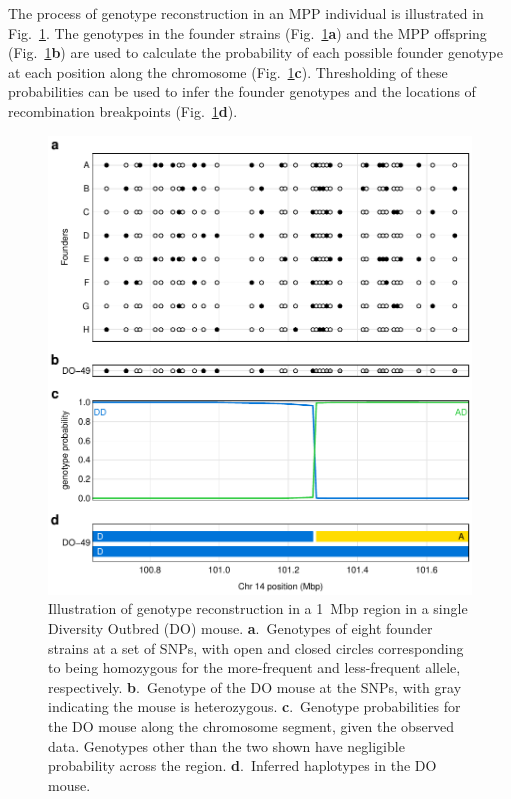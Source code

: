 \documentclass[12pt,letterpaper]{article}\usepackage[]{graphicx}\usepackage[table]{xcolor}
\begin{document}
The process of genotype reconstruction in an MPP individual is
illustrated in Fig.~\ref{fig1_genome_reconstr}. The genotypes in the
founder strains (Fig.~\ref{fig1_genome_reconstr}\textbf{a}) and the MPP
offspring (Fig.~\ref{fig1_genome_reconstr}\textbf{b}) are used to calculate the
probability of each possible founder genotype at each position along the chromosome
(Fig.~\ref{fig1_genome_reconstr}\textbf{c}). Thresholding of these
probabilities can be used to infer the founder genotypes and the
locations of recombination breakpoints (Fig.~\ref{fig1_genome_reconstr}\textbf{d}).



\begin{figure}
\centering
\includegraphics[width=\textwidth]{Figs/fig1_genome_reconstr.pdf}

\caption{Illustration of genotype reconstruction in a 1~Mbp region in
  a single Diversity Outbred (DO) mouse. \textbf{a}.~Genotypes of
  eight founder strains at a set of SNPs, with open and closed circles
  corresponding to being homozygous for the more-frequent and
  less-frequent allele, respectively. \textbf{b}.~Genotype of the DO
  mouse at the SNPs, with gray indicating the mouse is heterozygous.
  \textbf{c}.~Genotype probabilities for the DO mouse along the
  chromosome segment, given the observed data. Genotypes other than
  the two shown have negligible probability across the region.
  \textbf{d}.~Inferred haplotypes in the DO
  mouse.\label{fig1_genome_reconstr}}
\end{figure}
\end{document}
